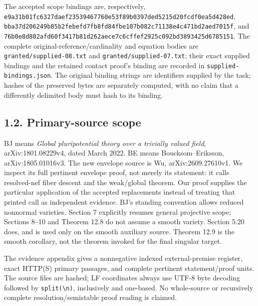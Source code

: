 \documentclass[
  10pt,
]{article}
\begin{document}
The accepted scope bindings are, respectively,
\texttt{e9a31b01\allowbreak{}fc6327da\allowbreak{}ef235394\allowbreak{}67760e53\allowbreak{}f89b0397\allowbreak{}ded5215d\allowbreak{}20fcdf0e\allowbreak{}a5d428ed},
\texttt{bba37d20\allowbreak{}6249b85b\allowbreak{}2febefd7\allowbreak{}fb8fd84f\allowbreak{}be107b08\allowbreak{}2c71138e\allowbreak{}4c471bd2\allowbreak{}aed7015f},
and
\texttt{76b0e8d8\allowbreak{}02afd60f\allowbreak{}3417b81d\allowbreak{}262aece7\allowbreak{}c6cffef2\allowbreak{}925c092b\allowbreak{}d3893425\allowbreak{}d6785151}.
The complete original-reference/cardinality and equation bodies are
\texttt{granted/supplied-08.txt} and \texttt{granted/supplied-07.txt};
their exact supplied bindings and the retained contact proof's binding
are recorded in \texttt{supplied-bindings.json}. The original binding
strings are identifiers supplied by the task; hashes of the preserved
bytes are separately computed, with no claim that a differently
delimited body must hash to its binding.

\subsection{1.2. Primary-source scope}\label{primary-source-scope}

BJ means \emph{Global pluripotential theory over a trivially valued
field}, arXiv:1801.08229v4, dated March 2022. BE means
Boucksom--Eriksson, arXiv:1805.01016v3. The new envelope source is Wu,
arXiv:2609.27610v1. We inspect its full pertinent envelope proof, not
merely its statement: it calls resolved-nef fiber descent and the
weak/global theorem. Our proof supplies the particular application of
the accepted replacements instead of treating that printed call as
independent evidence. BJ's standing convention allows reduced nonnormal
varieties. Section 7 explicitly resumes general projective scope;
Sections 8--10 and Theorem 12.8 do not assume a smooth variety. Section
5.20 does, and is used only on the smooth auxiliary source. Theorem 12.9
is the smooth corollary, not the theorem invoked for the final singular
target.

The evidence appendix gives a nonnegative indexed external-premise
register, exact HTTP(S) primary passages, and complete pertinent
statement/proof units. The source files are hashed; LF coordinates
always use UTF-8 byte decoding followed by
\texttt{split(\textquotesingle{}\textbackslash{}n\textquotesingle{})},
inclusively and one-based. No whole-source or recursively complete
resolution/semistable proof reading is claimed.
\end{document}
